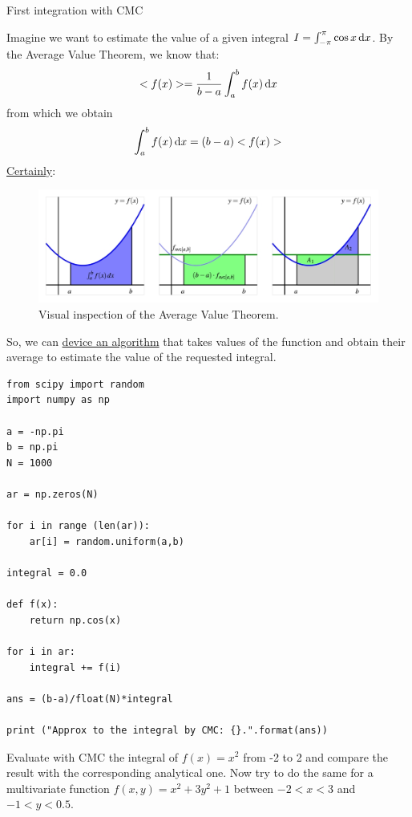 \documentclass{beamer}
\begin{document}
\begin{frame}{First integration with CMC}

    Imagine we want to estimate the value of a given integral $I=\int_{-\pi}^{\pi} \cos x \mathop{}\!\mathrm{d} x$.
    By the Average Value Theorem, we know that:
    \[
        <f(x)>=\frac{1}{b-a}\int_a^b f(x) \mathop{}\!\mathrm{d} x\]
    from which we obtain
    \[\int_a^b f(x) \mathop{}\!\mathrm{d} x = (b-a)<f(x)>
        \]
    \href{https://www.utrgv.edu/cstem/utrgv-calculus/integration/average-value/index.htm}{Certainly}:
    \begin{figure}
        \includegraphics[width=0.7\linewidth]{average-value}
        \caption{Visual inspection of the Average Value Theorem.}
        \label{fig:AVT}
    \end{figure}
    
    So, we can \href{https://www.geeksforgeeks.org/monte-carlo-integration-in-python/}{device an algorithm} that takes values of the function and obtain their average to estimate the value of the requested integral. 

\begin{lstlisting}
from scipy import random 
import numpy as np 
        
a = -np.pi
b = np.pi 
N = 1000
        
ar = np.zeros(N) 
        
for i in range (len(ar)): 
    ar[i] = random.uniform(a,b) 
        
integral = 0.0
        
def f(x): 
    return np.cos(x) 
        
for i in ar: 
    integral += f(i) 
        
ans = (b-a)/float(N)*integral 
        
print ("Approx to the integral by CMC: {}.".format(ans)) 
\end{lstlisting}

\begin{Exercise}[title={Integration}]
    Evaluate with CMC the integral of $f(x)=x^2$ from -2 to 2 and compare the result with the corresponding analytical one. Now try to do the same for a multivariate function $f(x,y)=x^2+3y^2+1$ between $-2<x<3$ and $-1<y<0.5$.
\end{Exercise}

\end{frame}
\end{document}
